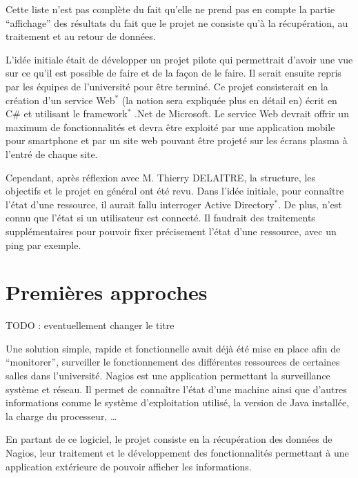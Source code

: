 Cette liste n'est pas compl\`ete du fait qu'elle ne prend pas en compte la partie ``affichage'' des r\'esultats du fait que le projet ne consiste qu'\`a la r\'ecup\'eration, au traitement et au retour de donn\'ees.

L'id\'ee initiale \'etait de d\'evelopper un projet pilote qui permettrait d'avoir une vue sur ce qu'il est possible de faire et de la fa\c{c}on de le faire.
Il serait ensuite repris par les \'equipes de l'universit\'e pour \^etre termin\'e.
Ce projet consisterait en la cr\'eation d'un service Web$^*$ (la notion sera expliqu\'ee plus en d\'etail en) %
\'ecrit en C\# et utilisant le framework$^*$ .Net de Microsoft.
Le service Web devrait offrir un maximum de fonctionnalit\'es et devra \^etre exploit\'e par une application mobile pour smartphone et par un site web pouvant \^etre projet\'e sur les \'ecrans plasma \`a l'entr\'e de chaque site.

Cependant, apr\`es r\'eflexion avec M. Thierry DELAITRE, la structure, les objectifs et le projet en g\'en\'eral ont \'et\'e revu.
Dans l'id\'ee initiale, pour conna\^itre l'\'etat d'une ressource, il aurait fallu interroger Active Directory$^*$. 
De plus, n'est connu que l'\'etat si un utilisateur est connect\'e.
Il faudrait des traitements suppl\'ementaires pour pouvoir fixer pr\'ecisement l'\'etat d'une ressource, avec un ping par exemple.

\section{Premi\`eres approches}

 TODO : eventuellement changer le titre

Une solution simple, rapide et fonctionnelle avait d\'ej\`a \'et\'e mise en place afin de ``monitorer'', surveiller le fonctionnement des diff\'erentes ressources de certaines salles dans l'universit\'e.
Nagios est une application permettant la surveillance syst\`eme et r\'eseau.
Il permet de conna\^itre l'\'etat d'une machine ainsi que d'autres informations comme le syst\`eme d'exploitation utilis\'e, la version de Java install\'ee, la charge du processeur, \ldots

En partant de ce logiciel, le projet consiste en la r\'ecup\'eration des donn\'ees de Nagios, leur traitement et le d\'eveloppement des fonctionnalit\'es permettant \`a une application ext\'erieure de pouvoir afficher les informations.

